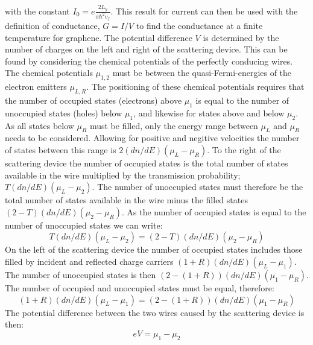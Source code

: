 \documentclass[12pt,a4paper]{article}
\begin{document}
			with the constant $I_{0}=e\frac{2L_{y}}{\pi\hbar^{2}v_{f}}$. This result for current can then be used with the definition of conductance, $G=I/V$ to find the conductance at a finite temperature for graphene. The potential difference $V$ is determined by the number of charges on the left and right of the scattering device. This can be found by considering the chemical potentials of the perfectly conducing wires. The chemical potentials $\mu_{1,2}$ must be between the quasi-Fermi-energies of the electron emitters $\mu_{L,R}$. The positioning of these chemical potentials requires that the number of occupied states (electrons) above $\mu_{1}$ is equal to the number of unoccupied states (holes) below $\mu_{1}$, and likewise for states above and below $\mu_{2}$. As all states below $\mu_{R}$ must be filled, only the energy range between $\mu_{L}$ and $\mu_{R}$ needs to be considered. Allowing for positive and negitive velocities the number of states between this range is $2\left(dn/dE\right)\left(\mu_{L}-\mu_{R}\right)$. To the right of the scattering device the number of occupied states is the total number of states available in the wire multiplied by the transmission probability; $T\left(dn/dE\right)\left(\mu_{L}-\mu_{2}\right)$. The number of unoccupied states must therefore be the total number of states available in the wire minus the filled states $\left(2-T\right)\left(dn/dE\right)\left(\mu_{2}-\mu_{R}\right)$. As the number of occupied states is equal to the number of unoccupied states we can write:
			\begin{equation}
				T\left(dn/dE\right)\left(\mu_{L}-\mu_{2}\right)=\left(2-T\right)\left(dn/dE\right)\left(\mu_{2}-\mu_{R}\right)
				\label{mu-2}
			\end{equation}
			On the left of the scattering device the number of occupied states includes those filled by incident and reflected charge carriers $\left(1+R\right)\left(dn/dE\right)\left(\mu_{L}-\mu_{1}\right)$. The number of unoccupied states is then $\left(2-\left(1+R\right)\right)\left(dn/dE\right)\left(\mu_{1}-\mu_{R}\right)$. The number of occupied and unoccupied states must be equal, therefore:
			\begin{equation}
				\left(1+R\right)\left(dn/dE\right)\left(\mu_{L}-\mu_{1}\right)=\left(2-\left(1+R\right)\right)\left(dn/dE\right)\left(\mu_{1}-\mu_{R}\right)
				\label{mu-1}
			\end{equation}
			The potential difference between the two wires caused by the scattering device is then:
			\begin{equation}
				eV=\mu_{1}-\mu_{2}
			\end{equation}
\end{document}
